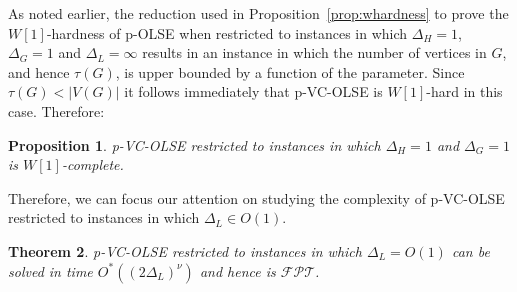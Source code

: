 \documentclass[11pt]{article}
\newtheorem{theorem}{Theorem}[section]
\newtheorem{proposition}[theorem]{Proposition}
\newcommand{\FPT}{\text{$\mathcal{FPT}$}}
\begin{document}
As noted earlier, the reduction used in Proposition~\ref{prop:whardness} to prove the $W[1]$-hardness of p-OLSE when restricted to instances in which $\Delta_H = 1$, $\Delta_G = 1$ and $\Delta_L=\infty$ results in an instance in which the number of vertices in $G$, and hence $\tau(G)$, is upper bounded by a function of the parameter. Since $\tau(G) < |V(G)|$ it follows immediately that p-VC-OLSE is $W[1]$-hard in this case.  Therefore:

\begin{proposition}
\label{prop:whardnessvc}
p-VC-OLSE restricted to instances in which $\Delta_H = 1$ and $\Delta_G = 1$ is $W[1]$-complete.
\end{proposition}

\vspace*{-1mm}
Therefore, we can focus our attention on studying the complexity of p-VC-OLSE restricted to instances in which $\Delta_L \in O(1)$.
\vspace*{-1mm}
\begin{theorem}
\label{thm:fptvslose}
p-VC-OLSE restricted to instances in which $\Delta_L = O(1)$ can be solved in time $O^*((2\Delta_L)^\nu)$ and hence is $\FPT$.
\end{theorem}
\vspace*{-3mm}
\end{document}
